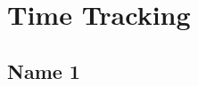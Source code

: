 \renewcommand*\chapterpagestyle{scrheadings}
\chapter{Time Tracking}
\section{Name 1}



\printtimeentries
